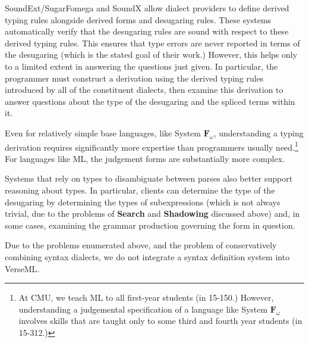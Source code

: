 {\begin{enumerate}
SoundExt/SugarFomega \cite{conf/popl/LorenzenE16} and SoundX \cite{conf/sle/RitschelE15} allow dialect providers to define derived typing rules alongside derived forms and desugaring rules. These systems automatically verify that the desugaring rules are sound with respect to these derived typing rules. This ensures that type errors are never reported in terms of the desugaring (which is the stated goal of their work.) However, this helps only to a limited extent in answering the questions just given. In particular, the programmer must construct a derivation using the derived typing rules introduced by all of the constituent dialects, then examine this derivation to answer questions about the type of the desugaring and the spliced terms within it. 

Even for relatively simple base languages, like System $\mathbf{F}_\omega$, understanding a typing derivation requires significantly more expertise than programmers usually need.\footnote{At CMU, we teach ML to all first-year students (in 15-150.) However, understanding a judgemental specification of a language like System $\mathbf{F}_\omega$ involves skills that are taught only to some third and fourth year students (in 15-312.)} For languages like ML, the judgement forms are substantially more complex. 

Systems that rely on types to disambiguate between parses also better support reasoning about types. In particular, clients can determine the type of the desugaring by determining the types of subexpressions (which is not always trivial, due to the problems of \textbf{Search} and \textbf{Shadowing} discussed above) and, in some cases, examining the grammar production governing the form in question.
\end{enumerate}


Due to the problems enumerated above, and the problem of conservatively combining syntax dialects, we do not integrate a syntax definition system into VerseML.%

}
